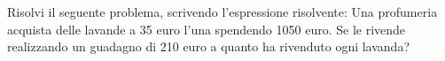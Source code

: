 \item Risolvi il seguente problema, scrivendo l'espressione risolvente: Una profumeria acquista delle lavande a 35 euro l'una spendendo 1050 euro. Se le rivende realizzando un guadagno di 210 euro a quanto ha rivenduto ogni lavanda?